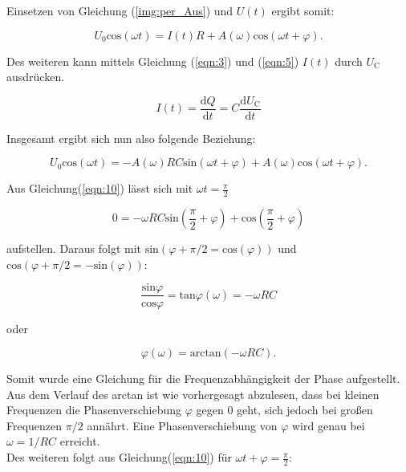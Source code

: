         \noindent Einsetzen von Gleichung (\ref{img:per_Aus}) und $U(t)$ ergibt somit:

        \begin{equation*}
            U_0 \text{cos}(\omega t) = I(t)R + A(\omega) \text{cos}(\omega t + \varphi) .
        \end{equation*}

        \noindent Des weiteren kann mittels Gleichung (\ref{eqn:3}) und (\ref{eqn:5}) $I(t)$ durch $U_{\text{C}}$ ausdrücken.

        \begin{equation}
            I(t) = \frac{\text{d}Q}{\text{d}t} = C \frac{\text{d}U_\text{C}}{\text{d}t}
            \label{eqn:9}
        \end{equation}

        \noindent Insgesamt ergibt sich nun also folgende Beziehung:

        \begin{equation}
            U_0 \text{cos}(\omega t) = -A(\omega) R C \text{sin}(\omega t + \varphi) + A(\omega) \text{cos}(\omega t + \varphi) .
            \label{eqn:10}
        \end{equation}

        \noindent Aus Gleichung(\ref{eqn:10}) lässt sich mit $\omega t = \frac{\pi}{2}$ 

        \begin{equation*}
            0 = -\omega R C \text{sin} \left( \frac{\pi}{2} + \varphi \right) + \text{cos} \left( \frac{\pi}{2} + \varphi \right)
        \end{equation*}

        \noindent aufstellen. Daraus folgt mit $\text{sin}(\varphi + \pi /2 = \text{cos}(\varphi))$ und $\text{cos}(\varphi + \pi/2 = - \text{sin}
        (\varphi))$:

        \begin{equation*}
            \frac{\text{sin} \varphi}{\text{cos} \varphi} = \text{tan} \varphi (\omega) = -\omega RC 
        \end{equation*}

        \noindent oder

        \begin{equation}
            \varphi (\omega) = \text{arctan} ( - \omega R C) .
            \label{eqn:11}
        \end{equation}

        \noindent Somit wurde eine Gleichung für die Frequenzabhängigkeit der Phase aufgestellt. Aus dem Verlauf des arctan ist wie vorhergesagt 
        abzulesen, dass bei kleinen Frequenzen die Phasenverschiebung $\varphi$ gegen 0 geht, sich jedoch bei großen Frequenzen $\pi/2$ annährt.
        Eine Phasenverschiebung von $\varphi$ wird genau bei $\omega = 1/RC$ erreicht.\\
        Des weiteren folgt aus Gleichung(\ref{eqn:10}) für $\omega t + \varphi = \frac{\pi}{2}$:

